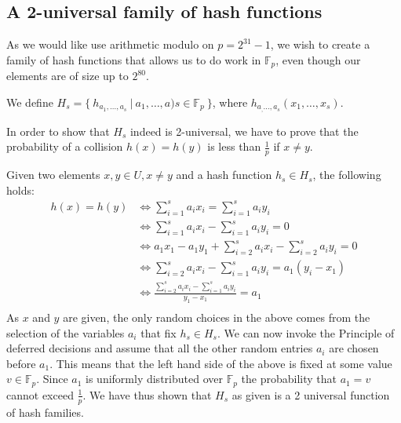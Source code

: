 \documentclass[article,a4paper,oneside]{article}
\newcommand{\+}[1]{\ensuremath{\boldsymbol{#1}}}
\begin{document}
\subsection*{A 2-universal family of hash functions}
As we would like use arithmetic modulo on $p = 2^{31}-1$, we wish to create a family of hash functions that allows us to do work in $\mathbb{F}_p$, even though our elements are of size up to $2^{80}$.

We define $H_s=\{\ h_{a_1,\ldots,a_s}\ | \ a_1,\ldots,a)s\in \mathbb{F}_p\ \}$,
where $h_{a_,\ldots,a_s}(x_1,\ldots,x_s)$.

In order to show that $H_s$ indeed is 2-universal, we have to prove that the probability of a collision $h(x) = h(y)$ is less than $\frac{1}{p}$ if $x \neq y$.

Given two elements $x,y \in U, x \neq y$ and a hash function $h_s \in H_s$, the following holds:
\begin{align*}
h(x) = h(y) &\iff \sum_{i=1}^{s}a_ix_i = \sum_{i=1}^sa_iy_i \\
&\iff \sum_{i=1}^{s}a_ix_i - \sum_{i=1}^sa_iy_i = 0 \\
&\iff a_1x_1 - a_1y_1 + \sum_{i=2}^{s}a_ix_i - \sum_{i=2}^sa_iy_i = 0 \\
&\iff \sum_{i=2}^{s}a_ix_i - \sum_{i=1}^sa_iy_i = a_1(y_i-x_1) \\
&\iff \frac{\sum_{i=2}^{s}a_ix_i - \sum_{i=1}^sa_iy_i}{y_1-x_1} = a_1 \\
\end{align*}
As $x$ and $y$ are given, the only random choices in the above comes from the selection of the variables $a_i$ that fix $h_s \in H_s$. We can now invoke the Principle of deferred decisions and assume that all the other random entries $a_i$ are chosen before $a_1$. This means that the left hand side of the above is fixed at some value $v \in \mathbb{F}_p$. Since $a_1$ is uniformly distributed over $\mathbb{F}_p$ the probability that $a_1 = v$ cannot exceed $\frac{1}{p}$. We have thus shown that $H_s$ as given is a 2 universal function of hash families.
\end{document}
